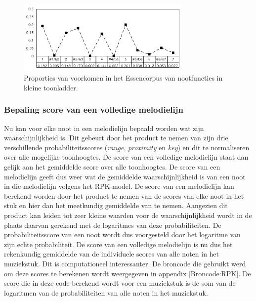 \begin{figure}[!ht]
  \centering
  \includegraphics[width=0.75\textwidth]{2_Objectieve_Beoordeling/key_minor}
  \caption{Proporties van voorkomen in het Essencorpus van nootfuncties in kleine toonladder.}
  \label{figuur:key_minor}
\end{figure}

\subsubsection{Bepaling score van een volledige melodielijn}
Nu kan voor elke noot in een melodielijn bepaald worden wat zijn waarschijnlijkheid is. Dit gebeurt door het product te nemen van zijn drie verschillende probabiliteitsscores (\textit{range}, \textit{proximity} en \textit{key}) en dit te normaliseren over alle mogelijke toonhoogtes. De score van een volledige melodielijn staat dan gelijk aan het gemiddelde score over alle toonhoogtes. De score van een melodielijn geeft dus weer wat de gemiddelde waarschijnlijkheid is van een noot in die melodielijn volgens het RPK-model. De score van een melodielijn kan berekend worden door het product te nemen van de scores van elke noot in het stuk en hier dan het meetkundig gemiddelde van te nemen. Aangezien dit product kan leiden tot zeer kleine waarden voor de waarschijnlijkheid wordt in de plaats daarvan gerekend met de logaritmes van deze probabiliteiten. De probabiliteitsscore van een noot wordt dus voorgesteld door het logaritme van zijn echte probabiliteit. De score van een volledige melodielijn is nu dus het rekenkundig gemiddelde van de individuele scores van alle noten in het muziekstuk. Dit is computationeel interessanter. De broncode die gebruikt werd om deze scores te berekenen wordt weergegeven in appendix \ref{Broncode:RPK}. De score die in deze code berekend wordt voor een muziekstuk is de som van de logaritmen van de probabiliteiten van alle noten in het muziekstuk.

